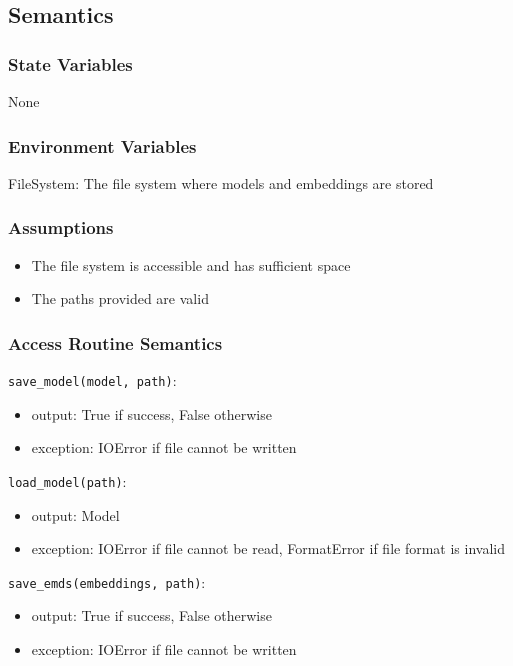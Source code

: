 \documentclass[12pt, titlepage]{article}
\begin{document}
\subsection{Semantics}

\subsubsection{State Variables}
None

\subsubsection{Environment Variables}

FileSystem: The file system where models and embeddings are stored

\subsubsection{Assumptions}

\begin{itemize}
  \item The file system is accessible and has sufficient space
  \item The paths provided are valid
\end{itemize}

\subsubsection{Access Routine Semantics}

\noindent \texttt{save\_model(model, path)}:
\begin{itemize}
\item output: True if success, False otherwise
\item exception: IOError if file cannot be written
\end{itemize}

\noindent \texttt{load\_model(path)}:
\begin{itemize}
\item output: Model
\item exception: IOError if file cannot be read, FormatError if file format is invalid
\end{itemize}

\noindent \texttt{save\_emds(embeddings, path)}:
\begin{itemize}
\item output: True if success, False otherwise
\item exception: IOError if file cannot be written
\end{itemize}
\end{document}

